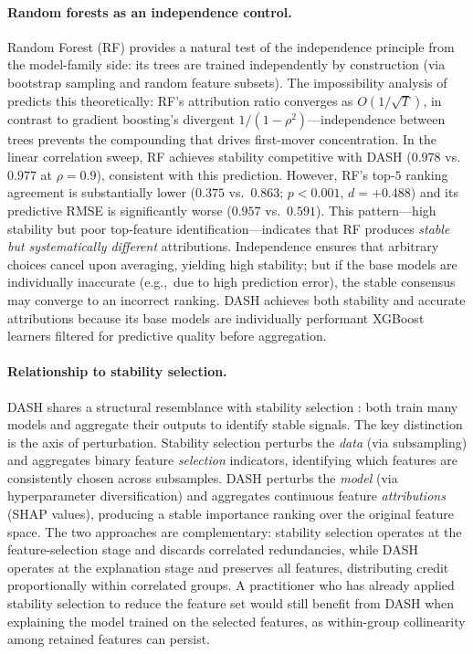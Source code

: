 \documentclass[10pt]{article}
\newcommand{\dash}{\textsc{DASH}}
\newcommand{\rhovar}{\rho}
\newcommand{\eg}{e.g.,\ }
\begin{document}
\paragraph{Random forests as an independence control.}
Random Forest (RF) provides a natural test of the independence principle
from the model-family side: its trees are trained independently by
construction (via bootstrap sampling and random feature subsets).
The impossibility analysis of \citet{caraker2026impossibility}
predicts this theoretically: RF's attribution ratio converges as
$O(1/\sqrt{T})$, in contrast to gradient boosting's divergent
$1/(1 - \rhovar^2)$---independence between trees prevents the
compounding that drives first-mover concentration. In the
linear correlation sweep, RF achieves stability competitive with
\dash{} ($0.978$ vs.\ $0.977$ at $\rhovar = 0.9$), consistent with
this prediction. However, RF's
top-$5$ ranking agreement is substantially lower ($0.375$ vs.\ $0.863$;
$p < 0.001$, $d = +0.488$) and its predictive RMSE is significantly
worse ($0.957$ vs.\ $0.591$). This pattern---high stability but poor
top-feature identification---indicates that RF produces \emph{stable
but systematically different} attributions. Independence ensures that
arbitrary choices cancel upon averaging, yielding high stability; but
if the base models are individually inaccurate (\eg due to high
prediction error), the stable consensus may converge to an incorrect
ranking. \dash{} achieves both stability and accurate attributions
because its base models are individually performant XGBoost learners
filtered for predictive quality before aggregation.

\paragraph{Relationship to stability selection.}
\dash{} shares a structural resemblance with stability selection
\citep{meinshausen2010stability}: both train many models and aggregate
their outputs to identify stable signals. The key distinction is the
axis of perturbation. Stability selection perturbs the \emph{data}
(via subsampling) and aggregates binary feature \emph{selection}
indicators, identifying which features are consistently chosen across
subsamples. \dash{} perturbs the \emph{model} (via hyperparameter
diversification) and aggregates continuous feature \emph{attributions}
(SHAP values), producing a stable importance ranking over the original
feature space. The two approaches are complementary: stability selection
operates at the feature-selection stage and discards correlated
redundancies, while \dash{} operates at the explanation stage and
preserves all features, distributing credit proportionally within
correlated groups. A practitioner who has already applied stability
selection to reduce the feature set would still benefit from \dash{}
when explaining the model trained on the selected features, as
within-group collinearity among retained features can persist.
\end{document}
